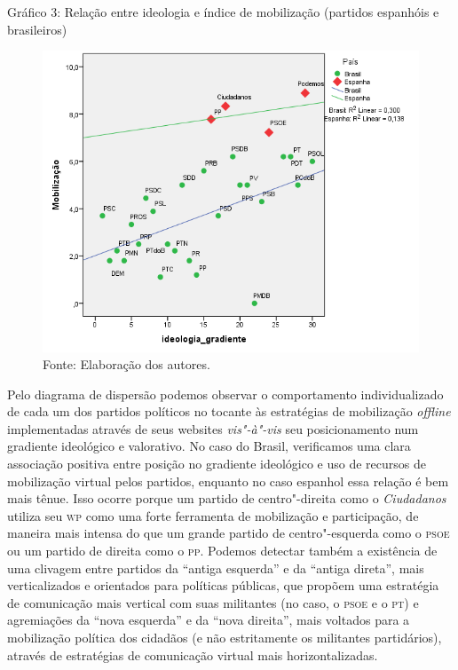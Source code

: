 \begin{center}
Gráfico 3: Relação entre ideologia e índice de mobilização (partidos
espanhóis e brasileiros)

\begin{figure}[!ht]
\centering
 \includegraphics[width=\textwidth]{./imgs/graf3.png}
\caption{Fonte: Elaboração dos autores.}
\end{figure}
\end{center}

Pelo diagrama de dispersão podemos observar o comportamento
individualizado de cada um dos partidos políticos no tocante às
estratégias de mobilização \emph{offline} implementadas através de seus
websites \emph{vis"-à"-vis} seu posicionamento num gradiente ideológico e
valorativo. No caso do Brasil, verificamos uma clara associação positiva
entre posição no gradiente ideológico e uso de recursos de mobilização
virtual pelos partidos, enquanto no caso espanhol essa relação é bem
mais tênue. Isso ocorre porque um partido de centro"-direita como o
\emph{Ciudadanos} utiliza seu \textsc{wp} como uma forte ferramenta de
mobilização e participação, de maneira mais intensa do que um grande
partido de centro"-esquerda como o \textsc{psoe} ou um partido de direita como o
\textsc{pp}. Podemos detectar também a existência de uma clivagem entre partidos
da ``antiga esquerda'' e da ``antiga direta'', mais verticalizados e
orientados para políticas públicas, que propõem uma estratégia de
comunicação mais vertical com suas militantes (no caso, o \textsc{psoe} e o \textsc{pt}) e
agremiações da ``nova esquerda'' e da ``nova direita'', mais voltados
para a mobilização política dos cidadãos (e não estritamente os
militantes partidários), através de estratégias de comunicação virtual
mais horizontalizadas.

